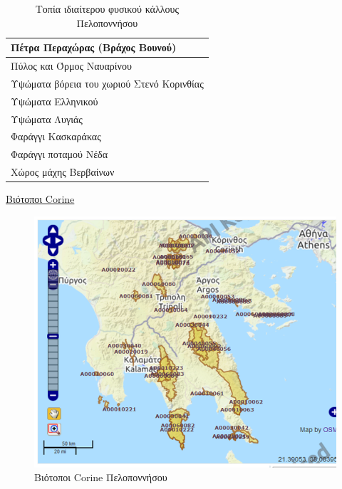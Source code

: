 \documentclass[12pt]{article}
\begin{document}
	\begin{table}[H]
		\centering
		\label{my-label}
		
		\begin{tabular}{|l|}
			\hline
			Πέτρα Περαχώρας (Βράχος Βουνού) \\ \hline
			Πύλος και Όρμος Ναυαρίνου \\ \hline
			Υψώματα βόρεια του χωριού Στενό Κορινθίας \\ \hline
			Υψώματα Ελληνικού \\ \hline
			Υψώματα Λυγιάς \\ \hline
			Φαράγγι Κασκαράκας \\ \hline
			Φαράγγι ποταμού Νέδα \\ \hline
			Χώρος μάχης Βερβαίνων \\ \hline
			
		\end{tabular}
		\caption{Τοπία ιδιαίτερου φυσικού κάλλους Πελοποννήσου}
	\end{table}
	
	\underline{Βιότοποι Corine}
	
	\begin{figure} [H]
		\begin{center}
			\includegraphics [scale = 0.60] {corine.png}
			\caption{Βιότοποι Corine Πελοποννήσου}
		\end{center}
	\end{figure}
\end{document}
